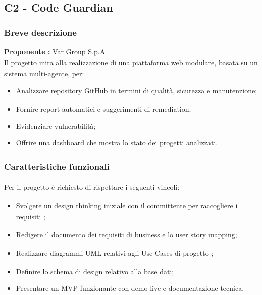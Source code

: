 \documentclass[a4paper,11pt]{article}
\begin{document}
\subsection{C2 - Code Guardian}
\subsubsection{Breve descrizione}
\textbf{Proponente\textsubscript{}
:} Var Group S.p.A
\vspace{0.5em}\\
Il progetto\textsubscript{}
 mira alla realizzazione di una piattaforma web modulare, basata su un sistema multi-agente, per:

\begin{itemize}[leftmargin=*]
  \item Analizzare repository\textsubscript{}
 GitHub\textsubscript{} in termini di qualità\textsubscript{}, sicurezza\textsubscript{} e manutenzione;
  \item Fornire report automatici e suggerimenti di remediation;
  \item Evidenziare vulnerabilità;
  \item Offrire una dashboard\textsubscript{}
 che mostra lo stato dei progetti\textsubscript{}
 analizzati.
\end{itemize}

\subsubsection{Caratteristiche funzionali\textsubscript{}
}
Per il progetto\textsubscript{}
 è richiesto di rispettare i seguenti vincoli:

\begin{itemize}[leftmargin=*]
  \item Svolgere un design thinking iniziale con il committente\textsubscript{}
 per raccogliere i requisiti\textsubscript{}
;
  \item Redigere il documento dei requisiti\textsubscript{}
 di business e lo user story mapping;
  \item Realizzare diagrammi UML relativi agli Use Cases\textsubscript{}
 di progetto\textsubscript{}
;
  \item Definire lo schema di design relativo alla base dati;
  \item Presentare un MVP funzionante con demo live e documentazione tecnica.
\end{itemize}
\end{document}
